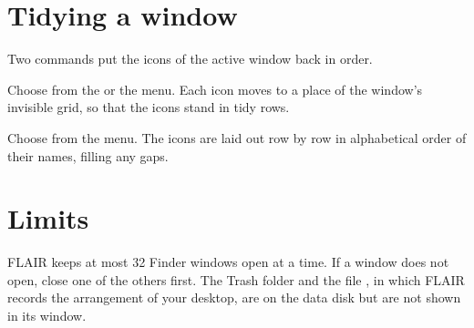 
\section{Tidying a window}
Two commands put the icons of the active window back in order.

Choose  from the  or
the  menu.  Each icon moves to a place of the window's
invisible grid, so that the icons stand in tidy rows.


Choose  from the
 menu.  The icons are laid out row by row in alphabetical
order of their names, filling any gaps.


\section{Limits}
FLAIR keeps at most 32 Finder windows open at a time.  If a window does
not open, close one of the others first.  The Trash folder and the file , in which FLAIR
records the arrangement of your desktop, are on the data disk but are not
shown in its window.
